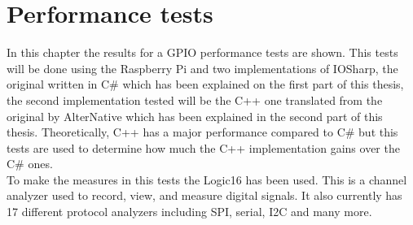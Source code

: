 \chapter{Performance tests}\label{C:Performance-Test}
In this chapter the results for a GPIO performance tests are shown. This tests will be done using the Raspberry Pi and two implementations of IOSharp, the original written in C\# which has been explained on the first part of this thesis, the second implementation tested will be the C++ one translated from the original by AlterNative which has been explained in the second part of this thesis. Theoretically, C++ has a major performance compared to C\# but this tests are used to determine how much the C++ implementation gains over the C\# ones.
\\
To make the measures in this tests the Logic16 has been used. This is a channel analyzer used to record, view, and measure digital signals. It also currently has 17 different protocol analyzers including SPI, serial, I2C and many more.

